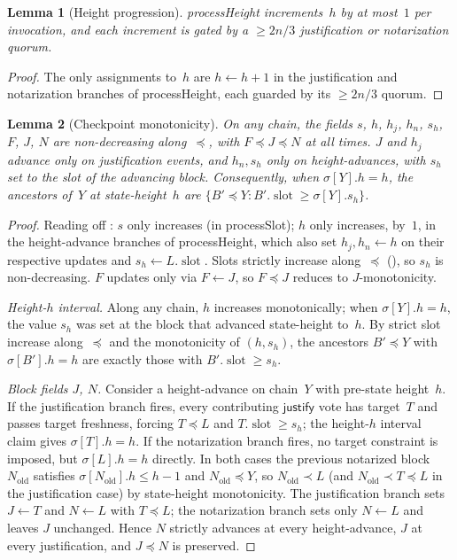 \ifx\litemode\undefined\documentclass{article}\fi
\newcommand{\slot}[0]{\ensuremath{\operatorname{\mathrm{slot}}}}
\newcommand{\just}{\ensuremath{\mathsf{justify}}\xspace}
\newcommand{\processSlot}{\textsf{processSlot}\xspace}
\newcommand{\processHeight}{\textsf{processHeight}\xspace}
\theoremstyle{plain}
\newtheorem{lemma}{Lemma}
\theoremstyle{definition}
\theoremstyle{remark}
\begin{document}
\begin{lemma}[Height progression]\label{lem:heightprog}
\processHeight increments~$h$ by at most~$1$ per invocation, and each increment is gated by a $\geq 2n/3$ justification or notarization quorum.
\end{lemma}

\begin{proof}
The only assignments to~$h$ are $h \gets h + 1$ in the justification and notarization branches of \processHeight, each guarded by its $\geq 2n/3$ quorum.
\end{proof}

\begin{lemma}[Checkpoint monotonicity]\label{lem:slotmono}
On any chain, the fields $s$, $h$, $h_j$, $h_n$, $s_h$, $F$, $J$, $N$ are non-decreasing along~$\preceq$, with $F \preceq J \preceq N$ at all times.
$J$ and $h_j$ advance only on justification events, and $h_n, s_h$ only on height-advances, with $s_h$ set to the slot of the advancing block.
Consequently, when $\sigma[Y].h = h$, the ancestors of~$Y$ at state-height~$h$ are $\{B' \preceq Y : B'.\slot \geq \sigma[Y].s_h\}$.
\end{lemma}

\begin{proof}
Reading off : $s$ only increases (in \processSlot); $h$ only increases, by~$1$, in the height-advance branches of \processHeight, which also set $h_j, h_n \gets h$ on their respective updates and $s_h \gets L.\slot$.
Slots strictly increase along~$\preceq$ (), so $s_h$ is non-decreasing.
$F$ updates only via $F \gets J$, so $F \preceq J$ reduces to $J$-monotonicity.

\emph{Height-$h$ interval.}
Along any chain, $h$ increases monotonically; when $\sigma[Y].h = h$, the value $s_h$ was set at the block that advanced state-height to~$h$.
By strict slot increase along~$\preceq$ and the monotonicity of $(h, s_h)$, the ancestors $B' \preceq Y$ with $\sigma[B'].h = h$ are exactly those with $B'.\slot \geq s_h$.

\emph{Block fields $J$, $N$.}
Consider a height-advance on chain~$Y$ with pre-state height~$h$.
If the justification branch fires, every contributing \just vote has target~$T$ and passes target freshness, forcing $T \preceq L$ and $T.\slot \geq s_h$; the height-$h$ interval claim gives $\sigma[T].h = h$.
If the notarization branch fires, no target constraint is imposed, but $\sigma[L].h = h$ directly.
In both cases the previous notarized block $N_{\mathrm{old}}$ satisfies $\sigma[N_{\mathrm{old}}].h \leq h - 1$ and $N_{\mathrm{old}} \preceq Y$, so $N_{\mathrm{old}} \prec L$ (and $N_{\mathrm{old}} \prec T \preceq L$ in the justification case) by state-height monotonicity.
The justification branch sets $J \gets T$ and $N \gets L$ with $T \preceq L$; the notarization branch sets only $N \gets L$ and leaves $J$ unchanged.
Hence $N$ strictly advances at every height-advance, $J$ at every justification, and $J \preceq N$ is preserved.
\end{proof}
\end{document}
